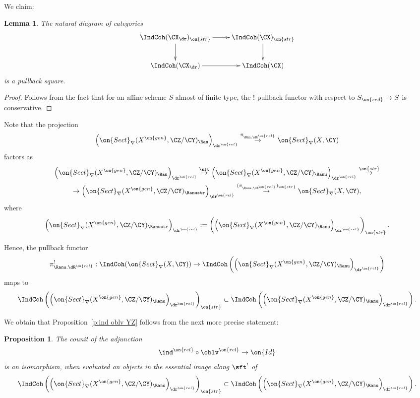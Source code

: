 \documentclass[9pt]{amsart}
\newtheorem{lem}[subsubsection]{Lemma}
\newtheorem{prop}[subsubsection]{Proposition}
\theoremstyle{remark}
\theoremstyle{definition}
\theoremstyle{remark}
\newcommand{\propref}[1]{Proposition~\ref{#1}}
\numberwithin{equation}{section}
\begin{document}
\sssec{}

We claim:

\begin{lem}\label{l:str reflects}
The natural diagram of categories
$$
\xymatrix{
\IndCoh(\CX_{\dr})_{\on{str}} \ar[r]\ar[d] & \IndCoh(\CX)_{\on{str}} \ar[d]\\
\IndCoh(\CX_{\dr}) \ar[r] & \IndCoh(\CX)
}
$$
is a pullback square.
\end{lem}

\begin{proof}

Follows from the fact that for an affine scheme $S$ almost of finite type, the !-pullback functor with respect to
$S_{\on{red}}\to S$ is conservative.

\end{proof}


\sssec{}

Note that the projection
$$\left(\on{Sect}_\nabla(X^{\on{gen}},\CZ/\CY)_\Ran\right)_{\dr^{\on{rel}}}\overset{\pi_{\Ran,\dR^{\on{rel}}}}\to 
\on{Sect}_\nabla(X,\CY)$$
factors as
\begin{multline*} 
\left(\on{Sect}_\nabla(X^{\on{gen}},\CZ/\CY)_\Ran\right)_{\dr^{\on{rel}}}
\overset{\sft}\to 
\left(\on{Sect}_\nabla(X^{\on{gen}},\CZ/\CY)_\Ranu\right)_{\dr^{\on{rel}}}\overset{\on{str}}\to \\
\to\left(\on{Sect}_\nabla(X^{\on{gen}},\CZ/\CY)_{\Ranustr}\right)_{\dr^{\on{rel}}} \overset{(\pi_{\Ranu,\dR^{\on{rel}}})_{\on{str}}}\to 
\on{Sect}_\nabla(X,\CY),
\end{multline*} 
where
$$\left(\on{Sect}_\nabla(X^{\on{gen}},\CZ/\CY)_{\Ranustr}\right)_{\dr^{\on{rel}}}:=
\left(\left(\on{Sect}_\nabla(X^{\on{gen}},\CZ/\CY)_{\Ranu}\right)_{\dr^{\on{rel}}}\right)_{\on{str}}.$$

Hence, the pullback functor
$$\pi_{\Ranu.\dR^{\on{rel}}}^!:\IndCoh(\on{Sect}_\nabla(X,\CY)) \to
\IndCoh\left(\left(\on{Sect}_\nabla(X^{\on{gen}},\CZ/\CY)_\Ranu\right)_{\dr^{\on{rel}}}\right)$$
maps to
$$\IndCoh\left(\left(\on{Sect}_\nabla(X^{\on{gen}},\CZ/\CY)_\Ranu\right)_{\dr^{\on{rel}}}\right)_{\on{str}}\subset
\IndCoh\left(\left(\on{Sect}_\nabla(X^{\on{gen}},\CZ/\CY)_\Ranu\right)_{\dr^{\on{rel}}}\right).$$

\sssec{}

We obtain that \propref{p:ind oblv YZ} follows from the next more precise statement:

\begin{prop} \label{p:ind oblv untl}
The counit of the adjunction
$$\ind^{\on{rel}}\circ \oblv^{\on{rel}}\to \on{Id}$$
is an isomorphism, when evaluated on objects in the essential image along $\sft^!$ of 
$$\IndCoh\left(\left(\on{Sect}_\nabla(X^{\on{gen}},\CZ/\CY)_\Ranu\right)_{\dr^{\on{rel}}}\right)_{\on{str}}\subset
\IndCoh\left(\left(\on{Sect}_\nabla(X^{\on{gen}},\CZ/\CY)_\Ranu\right)_{\dr^{\on{rel}}}\right).$$
\end{prop} 
\end{document}
